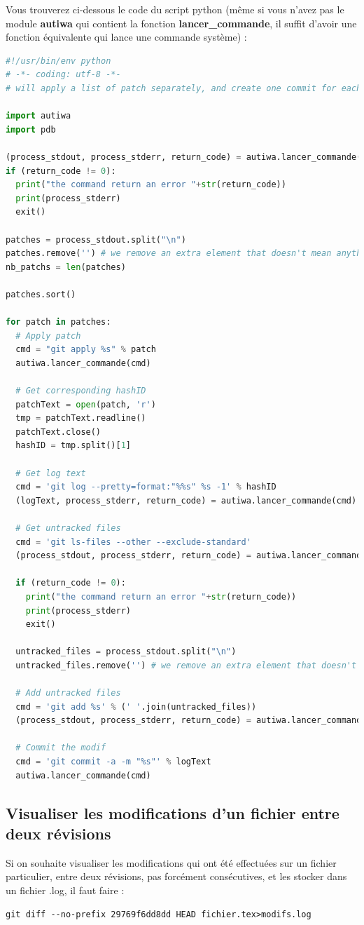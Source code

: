\documentclass[a4paper,twoside]{article}
\begin{document}
Vous trouverez ci-dessous le code du script python (même si vous n'avez pas le module \textbf{autiwa} qui contient la fonction \textbf{lancer\_commande}, il suffit d'avoir une fonction équivalente qui lance une commande système) : 
\begin{lstlisting}[language=python]
#!/usr/bin/env python
# -*- coding: utf-8 -*-
# will apply a list of patch separately, and create one commit for each single patch

import autiwa
import pdb

(process_stdout, process_stderr, return_code) = autiwa.lancer_commande("ls ../myPatch/*.patch")
if (return_code != 0):
  print("the command return an error "+str(return_code))
  print(process_stderr)
  exit()
  
patches = process_stdout.split("\n")
patches.remove('') # we remove an extra element that doesn't mean anything
nb_patchs = len(patches)

patches.sort()

for patch in patches:
  # Apply patch
  cmd = "git apply %s" % patch
  autiwa.lancer_commande(cmd)
  
  # Get corresponding hashID
  patchText = open(patch, 'r')
  tmp = patchText.readline()
  patchText.close()
  hashID = tmp.split()[1]
  
  # Get log text
  cmd = 'git log --pretty=format:"%%s" %s -1' % hashID
  (logText, process_stderr, return_code) = autiwa.lancer_commande(cmd)
  
  # Get untracked files
  cmd = 'git ls-files --other --exclude-standard'
  (process_stdout, process_stderr, return_code) = autiwa.lancer_commande(cmd)
  
  if (return_code != 0):
    print("the command return an error "+str(return_code))
    print(process_stderr)
    exit()
  
  untracked_files = process_stdout.split("\n")
  untracked_files.remove('') # we remove an extra element that doesn't mean anything
  
  # Add untracked files
  cmd = 'git add %s' % (' '.join(untracked_files))
  (process_stdout, process_stderr, return_code) = autiwa.lancer_commande(cmd)
  
  # Commit the modif
  cmd = 'git commit -a -m "%s"' % logText
  autiwa.lancer_commande(cmd)
\end{lstlisting}

\subsection{Visualiser les modifications d'un fichier entre deux révisions}
Si on souhaite visualiser les modifications qui ont été effectuées sur un fichier particulier, entre deux révisions, pas forcément consécutives, et les stocker dans un fichier .log, il faut faire :
\begin{verbatim}
git diff --no-prefix 29769f6dd8dd HEAD fichier.tex>modifs.log
\end{verbatim}
\end{document}
